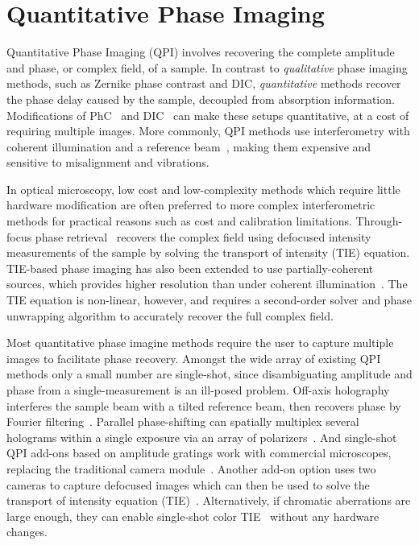 \section{Quantitative Phase Imaging}
Quantitative Phase Imaging (QPI) involves recovering the complete amplitude and phase, or complex field, of a sample. In contrast to \emph{qualitative} phase imaging methods, such as Zernike phase contrast and DIC, \emph{quantitative} methods recover the phase delay caused by the sample, decoupled from absorption information. Modifications of PhC~\cite{yun2010system} and DIC~\cite{CuiYangTearney2011} can make these setups quantitative, at a cost of requiring multiple images. More commonly, QPI methods use interferometry with coherent illumination and a reference beam~\cite{Wang2011, Popescu2006, Bhaduri:12}, making them expensive and sensitive to misalignment and vibrations.

In optical microscopy, low cost and low-complexity methods which require little hardware modification are often preferred to more complex interferometric methods for practical reasons such as cost and calibration limitations. Through-focus phase retrieval~\cite{waller2010transport, Petruccelli:12, Jingshan14GPTIE} recovers the complex field using defocused intensity measurements of the sample by solving the transport of intensity (TIE) equation. TIE-based phase imaging has also been extended to use partially-coherent sources, which provides higher resolution than under coherent illumination~\cite{JingsanSourceRecovery2016}. The TIE equation is non-linear, however, and requires a second-order solver and phase unwrapping algorithm to accurately recover the full complex field.

Most quantitative phase imagine methods require the user to capture multiple images to facilitate phase recovery. Amongst the wide array of existing QPI methods only a small number are single-shot, since disambiguating amplitude and phase from a single-measurement is an ill-posed problem. Off-axis holography interferes the sample beam with a tilted reference beam, then recovers phase by Fourier filtering~\cite{Witte:12}. Parallel phase-shifting can spatially multiplex several holograms within a single exposure via an array of polarizers~\cite{2004singleshotPSDH}. And single-shot QPI add-ons based on amplitude gratings work with commercial microscopes, replacing the traditional camera module~\cite{phasics,bon2012method}. Another add-on option uses two cameras to capture defocused images which can then be used to solve the transport of intensity equation (TIE)~\cite{allman2005optical}. Alternatively, if chromatic aberrations are large enough, they can enable single-shot color TIE~\cite{gross:14, wallerColorTIE} without any hardware changes.

